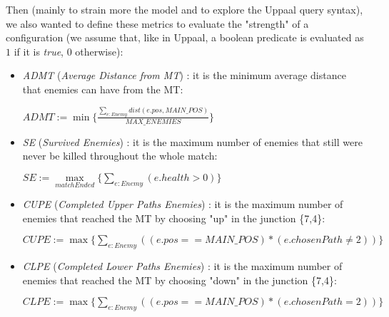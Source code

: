 \documentclass[
10pt, %
a4paper, %
oneside, %
headinclude,footinclude, %
BCOR5mm, %
]{scrartcl}
\begin{document}
			Then (mainly to strain more the model and to explore the Uppaal query syntax), we also wanted to define these metrics to evaluate the "strength" of a configuration (we assume that, like in Uppaal, a boolean predicate is evaluated as $1$ if it is \emph{true}, $0$ otherwise):
			\begin{itemize}
				\item \emph{ADMT} (\emph{Average Distance from MT}) : it is the minimum average distance that enemies can have from the MT:
				\begin{center}
					$ADMT:=\min\{\frac{\sum_{e:Enemy} dist(e.pos,MAIN\_POS)}{MAX\_ENEMIES}\}$
				\end{center}
				\item \emph{SE} (\emph{Survived Enemies}) : it is the maximum number of enemies that still were never be killed throughout the whole match:
				\begin{center}
					$SE:=\max\limits_{matchEnded}\{\sum_{e:Enemy} (e.health>0)\}$
				\end{center}
				\item \emph{CUPE} (\emph{Completed Upper Paths Enemies}) : it is the maximum number of enemies that reached the MT by choosing "up" in the junction \{7,4\}:
				\begin{center}
					$CUPE:=\max\{\sum_{e:Enemy} ((e.pos == MAIN\_POS)*(e.chosenPath\neq 2))\}$
				\end{center}
				\item \emph{CLPE} (\emph{Completed Lower Paths Enemies}) : it is the maximum number of enemies that reached the MT by choosing "down" in the junction \{7,4\}:
				\begin{center}
					$CLPE:=\max\{\sum_{e:Enemy} ((e.pos == MAIN\_POS)*(e.chosenPath=2))\}$
				\end{center}
			\end{itemize}
			
\end{document}
